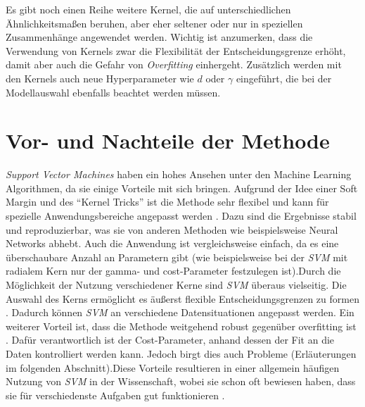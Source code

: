 \documentclass[
]{article}
\begin{document}
Es gibt noch einen Reihe weitere Kernel, die auf unterschiedlichen
Ähnlichkeitsmaßen beruhen, aber eher seltener oder nur in speziellen
Zusammenhänge angewendet werden. Wichtig ist anzumerken, dass die
Verwendung von Kernels zwar die Flexibilität der Entscheidungsgrenze
erhöht, damit aber auch die Gefahr von \textit{Overfitting} einhergeht.
Zusätzlich werden mit den Kernels auch neue Hyperparameter wie \(d\)
oder \(\gamma\) eingeführt, die bei der Modellauswahl ebenfalls beachtet
werden müssen.

\section{Vor- und Nachteile der Methode}

\textit{Support Vector Machines} haben ein hohes Ansehen unter den
Machine Learning Algorithmen, da sie einige Vorteile mit sich bringen.
Aufgrund der Idee einer Soft Margin und des ``Kernel Tricks'' ist die
Methode sehr flexibel und kann für spezielle Anwendungsbereiche
angepasst werden \parencite{bennettSupportVectorMachines2000}. Dazu sind
die Ergebnisse stabil und reproduzierbar, was sie von anderen Methoden
wie beispielsweise Neural Networks abhebt. Auch die Anwendung ist
vergleichsweise einfach, da es eine überschaubare Anzahl an Parametern
gibt (wie beispielsweise bei der \textit{SVM} mit radialem Kern nur der
gamma- und cost-Parameter festzulegen ist).\newline Durch die
Möglichkeit der Nutzung verschiedener Kerne sind \textit{SVM} überaus
vielseitig. Die Auswahl des Kerns ermöglicht es äußerst flexible
Entscheidungsgrenzen zu formen
\parencite{kuhnAppliedPredictiveModeling2013}. Dadurch können
\textit{SVM} an verschiedene Datensituationen angepasst werden.\newline
Ein weiterer Vorteil ist, dass die Methode weitgehend robust gegenüber
overfitting ist \parencite{kuhnAppliedPredictiveModeling2013}. Dafür
verantwortlich ist der Cost-Parameter, anhand dessen der Fit an die
Daten kontrolliert werden kann. Jedoch birgt dies auch Probleme
(Erläuterungen im folgenden Abschnitt).\newline Diese Vorteile
resultieren in einer allgemein häufigen Nutzung von \textit{SVM} in der
Wissenschaft, wobei sie schon oft bewiesen haben, dass sie für
verschiedenste Aufgaben gut funktionieren
\parencite{kuhnAppliedPredictiveModeling2013}.
\end{document}

